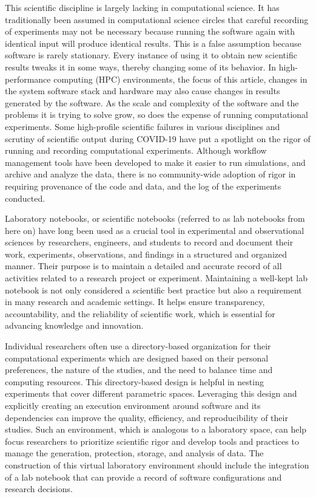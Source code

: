 \documentclass{IEEEcsmag}
\begin{document}
This scientific discipline is largely lacking in computational science. It has traditionally been
assumed in computational science circles that careful recording of experiments may not be necessary because running the software again with identical input will produce identical results. This is a false assumption because software is rarely stationary. Every instance
of using it to obtain new scientific results tweaks it in some ways, thereby changing some of its behavior. In high-performance computing (HPC) 
 environments, the focus of this article,  changes in the system software stack and hardware may also cause
changes in results generated by the software. As the scale and complexity of the software and the problems it is trying to solve grow, so does the expense of running computational experiments. Some high-profile scientific failures in various disciplines and scrutiny of scientific output during COVID-19 have put a spotlight on the rigor of running and recording computational
experiments. Although workflow management tools have been developed to make it easier to run simulations, and archive and analyze the data, there is no community-wide adoption of rigor in requiring provenance of the code and data, and the log of the experiments conducted. 

Laboratory notebooks, or scientific notebooks (referred to as lab notebooks from here on) have long been used as a crucial tool in experimental and observational sciences by researchers, engineers, and students to record and document their work, experiments, observations, and findings in a structured and organized manner. Their purpose is to maintain a
detailed and accurate record of all activities related to a research project or experiment. Maintaining a well-kept lab notebook is not only considered a scientific best practice but also a requirement in
many research and academic settings. It helps ensure transparency, accountability, and the reliability of scientific work, which is
essential for advancing knowledge and innovation.

Individual researchers often use a directory-based organization for their computational experiments which are designed based on their personal preferences, the nature of the studies, and the need to balance time and computing resources. This directory-based design is helpful in nesting experiments that cover different parametric spaces. Leveraging this design and explicitly creating an execution environment around software and its dependencies can improve the quality, efficiency, and reproducibility of their studies. Such an environment, which is analogous to a laboratory space, can help focus researchers to prioritize scientific rigor and develop tools and practices to manage the generation, protection, storage, and analysis of data. The construction of this virtual laboratory environment should include the integration of a lab notebook that can provide a record of software configurations and research decisions.
 
\end{document}
